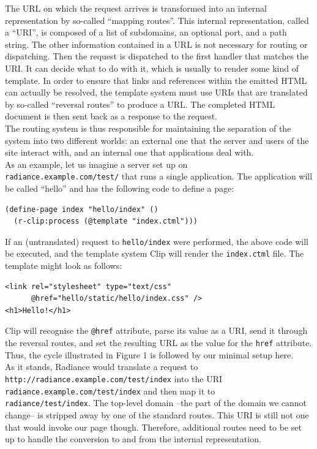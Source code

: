 \documentclass{sig-alternate}
\begin{document}
The URL on which the request arrives is transformed into an internal representation by so-called ``mapping routes''. This internal representation, called a ``URI'', is composed of a list of subdomains, an optional port, and a path string. The other information contained in a URL is not necessary for routing or dispatching. Then the request is dispatched to the first handler that matches the URI. It can decide what to do with it, which is usually to render some kind of template. In order to ensure that links and references within the emitted HTML can actually be resolved, the template system must use URIs that are translated by so-called ``reversal routes'' to produce a URL. The completed HTML document is then sent back as a response to the request. \\

The routing system is thus responsible for maintaining the separation of the system into two different worlds: an external one that the server and users of the site interact with, and an internal one that applications deal with. \\

As an example, let us imagine a server set up on \\ \texttt{radiance.example.com/test/} that runs a single application. The application will be called ``hello'' and has the following code to define a page:

\begin{verbatim}
(define-page index "hello/index" ()
  (r-clip:process (@template "index.ctml")))
\end{verbatim}

If an (untranslated) request to \texttt{hello/index} were performed, the above code will be executed, and the template system Clip\cite{clip} will render the \texttt{index.ctml} file. The template might look as follows:

\begin{verbatim}
<link rel="stylesheet" type="text/css"
      @href="hello/static/hello/index.css" />
<h1>Hello!</h1>
\end{verbatim}

Clip will recognise the \texttt{@href} attribute, parse its value as a URI, send it through the reversal routes, and set the resulting URL as the value for the \texttt{href} attribute. Thus, the cycle illustrated in Figure 1 is followed by our minimal setup here. \\

As it stands, Radiance would translate a request to \\\texttt{http://radiance.example.com/test/index} into the URI \\\texttt{radiance.example.com/test/index} and then map it to \\\texttt{radiance/test/index}. The top-level domain --the part of the domain we cannot change-- is stripped away by one of the standard routes. This URI is still not one that would invoke our page though. Therefore, additional routes need to be set up to handle the conversion to and from the internal representation.
\end{document}
